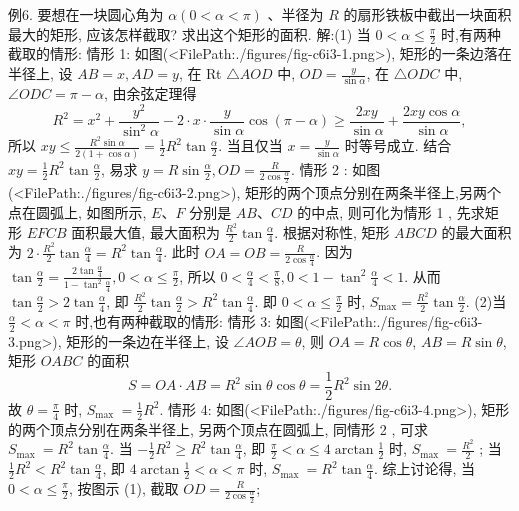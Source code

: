 例6. 要想在一块圆心角为 $\alpha(0<\alpha<\pi)$ 、半径为 $R$ 的扇形铁板中截出一块面积最大的矩形, 应该怎样截取? 求出这个矩形的面积.
解:(1) 当 $0<\alpha \leqslant \frac{\pi}{2}$ 时,有两种截取的情形:
情形 1: 如图(<FilePath:./figures/fig-c6i3-1.png>), 矩形的一条边落在半径上, 设 $A B=x, A D=y$, 在 Rt $\triangle A O D$ 中, $O D=\frac{y}{\sin \alpha}$, 在 $\triangle O D C$ 中, $\angle O D C=\pi-\alpha$, 由余弦定理得
$$
R^2=x^2+\frac{y^2}{\sin ^2 \alpha}-2 \cdot x \cdot \frac{y}{\sin \alpha} \cos (\pi-\alpha) \geqslant \frac{2 x y}{\sin \alpha}+\frac{2 x y \cos \alpha}{\sin \alpha},
$$
所以 $x y \leqslant \frac{R^2 \sin \alpha}{2(1+\cos \alpha)}=\frac{1}{2} R^2 \tan \frac{\alpha}{2}$. 当且仅当 $x=\frac{y}{\sin \alpha}$ 时等号成立.
结合 $x y=\frac{1}{2} R^2 \tan \frac{\alpha}{2}$, 易求 $y=R \sin \frac{\alpha}{2}, O D=\frac{R}{2 \cos \frac{\alpha}{2}}$.
情形 2 : 如图(<FilePath:./figures/fig-c6i3-2.png>), 矩形的两个顶点分别在两条半径上,另两个点在圆弧上, 如图所示, $E 、 F$ 分别是 $A B 、 C D$ 的中点, 则可化为情形 1 , 先求矩形 $E F C B$ 面积最大值, 最大面积为 $\frac{R^2}{2} \tan \frac{\alpha}{4}$. 根据对称性, 矩形 $A B C D$ 的最大面积为 $2 \cdot \frac{R^2}{2} \tan \frac{\alpha}{4}=R^2 \tan \frac{\alpha}{4}$. 此时 $O A=O B=\frac{R}{2 \cos \frac{\alpha}{4}}$.
因为 $\tan \frac{\alpha}{2}=\frac{2 \tan \frac{\alpha}{4}}{1-\tan ^2 \frac{\alpha}{4}}, 0<\alpha \leqslant \frac{\pi}{2}$, 所以 $0<\frac{\alpha}{4}<\frac{\pi}{8}, 0<1- \tan ^2 \frac{\alpha}{4}<1$. 从而 $\tan \frac{\alpha}{2}>2 \tan \frac{\alpha}{4}$, 即 $\frac{R^2}{2} \tan \frac{\alpha}{2}>R^2 \tan \frac{\alpha}{4}$. 即 $0<\alpha \leqslant \frac{\pi}{2}$ 时, $S_{\max }=\frac{R^2}{2} \tan \frac{\alpha}{2}$.
 (2)当 $\frac{\alpha}{2}<\alpha<\pi$ 时,也有两种截取的情形:
情形 3: 如图(<FilePath:./figures/fig-c6i3-3.png>), 矩形的一条边在半径上, 设 $\angle A O B=\theta$, 则 $O A=R \cos \theta$, $A B=R \sin \theta$, 矩形 $O A B C$ 的面积
$$
S=O A \cdot A B=R^2 \sin \theta \cos \theta=\frac{1}{2} R^2 \sin 2 \theta .
$$
故 $\theta=\frac{\pi}{4}$ 时, $S_{\text {max }}=\frac{1}{2} R^2$.
情形 4: 如图(<FilePath:./figures/fig-c6i3-4.png>), 矩形的两个顶点分别在两条半径上, 另两个顶点在圆弧上, 同情形 2 , 可求
$S_{\text {max }}=R^2 \tan \frac{\alpha}{4}$. 当 $-\frac{1}{2} R^2 \geqslant R^2 \tan \frac{\alpha}{4}$, 即 $\frac{\pi}{2}<\alpha \leqslant 4 \arctan \frac{1}{2}$ 时, $S_{\text {max }}=\frac{R^2}{2}$ ;
当 $\frac{1}{2} R^2<R^2 \tan \frac{\alpha}{4}$, 即 $4 \arctan \frac{1}{2}<\alpha<\pi$ 时, $S_{\text {max }}=R^2 \tan \frac{\alpha}{4}$.
综上讨论得, 当 $0<\alpha \leqslant \frac{\pi}{2}$, 按图示 (1), 截取 $O D=\frac{R}{2 \cos \frac{\alpha}{2}}$;
